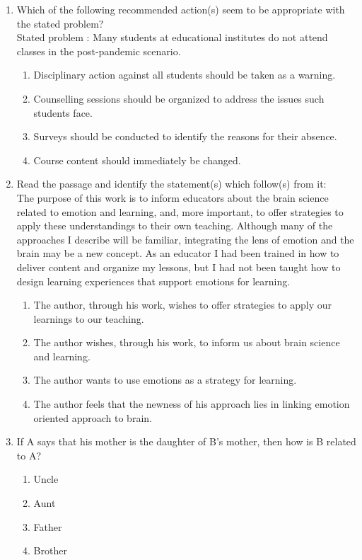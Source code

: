 \documentclass{article}
\begin{document}
\begin{enumerate}[leftmargin=*, start=18, label=Q.\arabic*.]
    \item Which of the following recommended action(s) seem to be appropriate with the stated problem? \\
    Stated problem : Many students at educational institutes do not attend classes in the post-pandemic scenario.
    
    \begin{enumerate}
        \item Disciplinary action against all students should be taken as a warning.
        \item Counselling sessions should be organized to address the issues such students face.
        \item Surveys should be conducted to identify the reasons for their absence.
        \item Course content should immediately be changed.
    \end{enumerate}

    \item Read the passage and identify the statement(s) which follow(s) from it: \\
    The purpose of this work is to inform educators about the brain science related to emotion and learning, and, more important, to offer strategies to apply these understandings to their own teaching. Although many of the approaches I describe will be familiar, integrating the lens of emotion and the brain may be a new concept. As an educator I had been trained in how to deliver content and organize my lessons, but I had not been taught how to design learning experiences that support emotions for learning.
    
    \begin{enumerate}
        \item The author, through his work, wishes to offer strategies to apply our learnings to our teaching.
        \item The author wishes, through his work, to inform us about brain science and learning.
        \item The author wants to use emotions as a strategy for learning.
        \item The author feels that the newness of his approach lies in linking emotion oriented approach to brain.
    \end{enumerate}

    \item If A  says that his mother is the daughter of B’s mother, then how is B related to A?
    
    \begin{multicols}{4}
        \begin{enumerate}
            \item Uncle
            \item Aunt
            \item Father
            \item Brother
        \end{enumerate}
    \end{multicols}
\end{enumerate}
\end{document}
